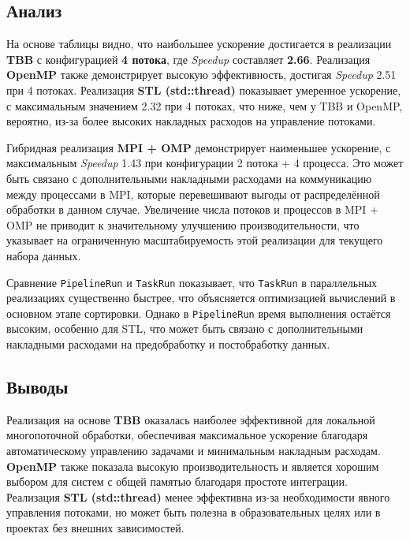 \documentclass[12pt]{article}
\begin{document}
\subsection*{Анализ}
\hspace*{1.25em}На основе таблицы видно, что наибольшее ускорение достигается в реализации \textbf{TBB} с конфигурацией \textbf{4 потока}, где \textit{Speedup} составляет \textbf{2.66}. Реализация \textbf{OpenMP} также демонстрирует высокую эффективность, достигая \textit{Speedup} 2.51 при 4 потоках. Реализация \textbf{STL (std::thread)} показывает умеренное ускорение, с максимальным значением 2.32 при 4 потоках, что ниже, чем у TBB и OpenMP, вероятно, из-за более высоких накладных расходов на управление потоками.

\hspace*{1.25em}Гибридная реализация \textbf{MPI + OMP} демонстрирует наименьшее ускорение, с максимальным \textit{Speedup} 1.43 при конфигурации 2 потока + 4 процесса. Это может быть связано с дополнительными накладными расходами на коммуникацию между процессами в MPI, которые перевешивают выгоды от распределённой обработки в данном случае. Увеличение числа потоков и процессов в MPI + OMP не приводит к значительному улучшению производительности, что указывает на ограниченную масштабируемость этой реализации для текущего набора данных.

\hspace*{1.25em}Сравнение \texttt{PipelineRun} и \texttt{TaskRun} показывает, что \texttt{TaskRun} в параллельных реализациях существенно быстрее, что объясняется оптимизацией вычислений в основном этапе сортировки. Однако в \texttt{PipelineRun} время выполнения остаётся высоким, особенно для STL, что может быть связано с дополнительными накладными расходами на предобработку и постобработку данных.

\subsection*{Выводы}
\hspace*{1.25em}Реализация на основе \textbf{TBB} оказалась наиболее эффективной для локальной многопоточной обработки, обеспечивая максимальное ускорение благодаря автоматическому управлению задачами и минимальным накладным расходам. \textbf{OpenMP} также показала высокую производительность и является хорошим выбором для систем с общей памятью благодаря простоте интеграции. Реализация \textbf{STL (std::thread)} менее эффективна из-за необходимости явного управления потоками, но может быть полезна в образовательных целях или в проектах без внешних зависимостей.
\end{document}
